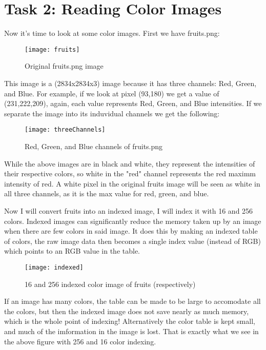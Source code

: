 \section{Task 2: Reading Color Images}

Now it's time to look at some color images. First we have fruits.png:

\begin{figure}[H]
    \centering
    \texttt{[image: fruits]}
    \caption{Original fruits.png image}
\end{figure}

This image is a (2834x2834x3) image because it has three channels: Red, Green, and
Blue. For example, if we look at pixel (93,180) we get a value of (231,222,209),
again, each value represents Red, Green, and Blue intensities. If we separate
the image into its induvidual channels we get the following:

\begin{figure}[H]
    \centering
    \texttt{[image: threeChannels]}
    \caption{Red, Green, and Blue channels of fruits.png}
\end{figure}

While the above images are in black and white, they represent the intensities of
their respective colors, so white in the "red" channel represents the red maximm
intensity of red. A white pixel in the original fruits image will be seen as
white in all three channels, as it is the max value for red, green, and blue.

Now I will convert fruits into an indexed image, I will index it with 16 and 256
colors. Indexed images can significantly reduce the memory taken up by an image
when there are few colors in said image. It does this by making an indexed table
of colors, the raw image data then becomes a single index value (instead of RGB)
which points to an RGB value in the table.

\begin{figure}[H]
    \centering
    \texttt{[image: indexed]}
    \caption{16 and 256 indexed color image of fruits (respectively)}
\end{figure}

If an image has many colors, the table can be made to be large to accomodate all
the colors, but then the indexed image does not save nearly as much memory,
which is the whole point of indexing! Alternatively the color table is kept
small, and much of the imformation in the image is lost. That is exactly what we
see in the above figure with 256 and 16 color indexing.
